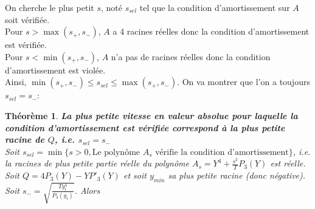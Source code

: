 \documentclass[11pt]{article}
\newtheorem{theorem}{Théorème}
\begin{document}
On cherche le plus petit $s$, noté $s_{sel}$ tel que la condition d'amortissement sur $A$ soit vérifiée.\\
Pour $s> \max(s_+,s_-)$, $A$ a 4 racines réelles donc la condition d'amortissement est vérifiée.\\
Pour $s< \min(s_+,s_-)$, $A$ n'a pas de racines réelles donc la condition d'amortissement est violée.\\
Ainsi, $ \min(s_+,s_-) \leq s_{sel} \leq \max(s_+,s_-)$.
On va montrer que l'on a toujours $s_{sel} = s_-$: 
\begin{theorem}\textbf{{La plus petite vitesse en valeur absolue pour laquelle la condition d'amortissement est vérifiée correspond à la plus petite racine de $Q$, i.e. $s_{sel}=s_-$}}\\
Soit $s_{sel} =\min \{s>0,\text{Le polynôme $A_s$ vérifie la condition d'amortissement} \}$, i.e. la racines de plus petite partie réelle du polynôme $A_s= Y^4 + \frac{s^2}{T}P_3(Y)$ est réelle.\\
Soit $Q = 4P_3(Y)-YP'_3(Y)$ et soit $y_{min}$ sa plus petite racine (donc négative). Soit $s_- =  \sqrt{\frac{Ty_i^4}{P_3(y_i)}} $.
Alors 
\end{theorem}
\end{document}
